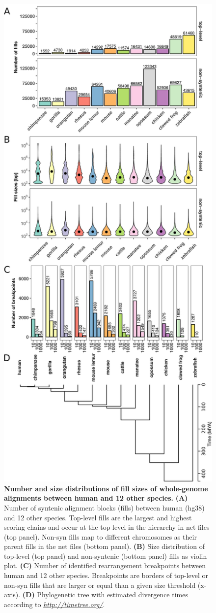 \documentclass[a4paper,twoside=true,openright,parskip=full,chapterprefix=true,11pt,headings=normal,bibliography=totoc,listof=totoc,titlepage=on,captions=tableabove,draft=false]{scrreprt}
\theoremstyle{definition}
\theoremstyle{definition}
\theoremstyle{definition}
\theoremstyle{remark}
\begin{document}
\begin{figure}

{\centering \includegraphics[width=0.5\linewidth]{figures/TAD_evolution/fig1_v02} 

}

\caption{\textbf{Number and size distributions of fill sizes of
whole-genome alignments between human and 12 other species. }
\textbf{(A)} Number of syntenic alignment blocks (fills) between human
(hg38) and 12 other species. Top-level fills are the largest and highest
scoring chains and occur at the top level in the hierarchy in net files
(top panel). Non-syn fills map to different chromosomes as their parent
fills in the net files (bottom panel). \textbf{(B)} Size distribution of
top-level (top panel) and non-syntenic (bottom panel) fills as violin
plot. \textbf{(C)} Number of identified rearrangement breakpoints
between human and 12 other species. Breakpoints are borders of top-level
or non-syn fills that are larger or equal than a given size threshold
(x-axis). \textbf{(D)} Phylogenetic tree with estimated divergence times
according to \href{http://timetree.org/}{\emph{http://timetree.org/}}.}\label{fig:TadEvo1}
\end{figure}
\end{document}
